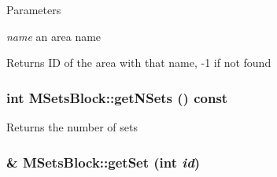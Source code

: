 \begin{DoxyParams}{Parameters}
\item[{\em name}]an area name \end{DoxyParams}
\begin{DoxyReturn}{Returns}
ID of the area with that name, -\/1 if not found 
\end{DoxyReturn}
\hypertarget{classMSetsBlock_a0950179c8789b05e53fafc981281e694}{
\subsubsection[{getNSets}]{\setlength{\rightskip}{0pt plus 5cm}int MSetsBlock::getNSets () const}}
\label{classMSetsBlock_a0950179c8789b05e53fafc981281e694}
\begin{DoxyReturn}{Returns}
the number of sets 
\end{DoxyReturn}
\hypertarget{classMSetsBlock_ac38f25bafc3eaaa704e3bc3d892f3783}{
\subsubsection[{getSet}]{\& MSetsBlock::getSet (int {\em id})}}
\label{classMSetsBlock_ac38f25bafc3eaaa704e3bc3d892f3783}

